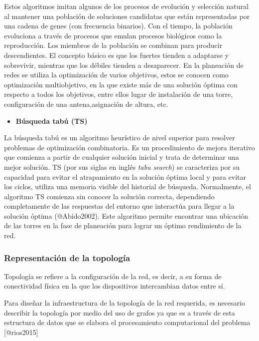 \documentclass[]{article}
\providecommand{\tightlist}{%
  \setlength{\itemsep}{0pt}\setlength{\parskip}{0pt}}
\begin{document}
Estos algoritmos imitan algunos de los procesos de evolución y selección
natural al mantener una población de soluciones candidatas que están
representadas por una cadena de genes (con frecuencia binarios). Con el
tiempo, la población evoluciona a través de procesos que emulan procesos
biológicos como la reproducción. Los miembros de la población se
combinan para producir descendientes. El concepto básico es que los
fuertes tienden a adaptarse y sobrevivir, mientras que los débiles
tienden a desaparecer. En la planeación de redes se utiliza la
optimización de varios objetivos, estos se conocen como optimización
multiobjetivo, en la que existe más de una solución óptima con respecto
a todos los objetivos, entre ellos lugar de instalación de una torre,
configuración de una antena,asignación de altura, etc.

\begin{itemize}
\tightlist
\item
  \textbf{Búsqueda tabú (TS)}
\end{itemize}

La búsqueda tabú es un algoritmo heurístico de nivel superior para
resolver problemas de optimización combinatoria. Es un procedimiento de
mejora iterativo que comienza a partir de cualquier solución inicial y
trata de determinar una mejor solución. TS (por sus siglas en inglés
\emph{tabu search}) se caracteriza por su capacidad para evitar el
atrapamiento en la solución óptima local y para evitar los ciclos,
utiliza una memoria visible del historial de búsqueda. Normalmente, el
algoritmo TS comienza sin conocer la solución correcta, dependiendo
completamente de las respuestas del entorno que interactúa para llegar a
la solución óptima (@Abido2002). Este algoritmo permite encontrar una
ubicación de las torres en la fase de planeación para lograr un óptimo
rendimiento de la red.

\subsubsection{Representación de la
topología}\label{representaciuxf3n-de-la-topologuxeda}

Topología se refiere a la configuración de la red, es decir, a su forma
de conectividad física en la que los dispositivos intercambian datos
entre sí.

Para diseñar la infraestructura de la topología de la red requerida, es
necesario describir la topología por medio del uso de grafos ya que es a
través de esta estructura de datos que se elabora el procesamiento
computacional del problema {[}@rios2015{]}
\end{document}
